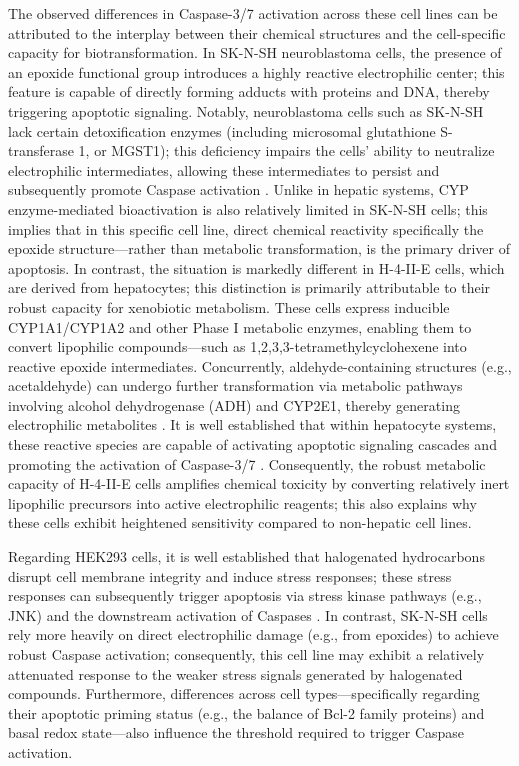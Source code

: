 \documentclass[letterpaper]{article}
\begin{document}
The observed differences in Caspase-3/7 activation across these cell lines can be attributed to the interplay between their chemical structures and the cell-specific capacity for biotransformation. In SK-N-SH neuroblastoma cells, the presence of an epoxide functional group introduces a highly reactive electrophilic center; this feature is capable of directly forming adducts with proteins and DNA, thereby triggering apoptotic signaling. Notably, neuroblastoma cells such as SK-N-SH lack certain detoxification enzymes (including microsomal glutathione S-transferase 1, or MGST1); this deficiency impairs the cells' ability to neutralize electrophilic intermediates, allowing these intermediates to persist and subsequently promote Caspase activation \cite{kelner2014absence}. Unlike in hepatic systems, CYP enzyme-mediated bioactivation is also relatively limited in SK-N-SH cells; this implies that in this specific cell line, direct chemical reactivity specifically the epoxide structure—rather than metabolic transformation, is the primary driver of apoptosis.
In contrast, the situation is markedly different in H-4-II-E cells, which are derived from hepatocytes; this distinction is primarily attributable to their robust capacity for xenobiotic metabolism. These cells express inducible CYP1A1/CYP1A2 and other Phase I metabolic enzymes, enabling them to convert lipophilic compounds—such as 1,2,3,3-tetramethylcyclohexene into reactive epoxide intermediates. Concurrently, aldehyde-containing structures (e.g., acetaldehyde) can undergo further transformation via metabolic pathways involving alcohol dehydrogenase (ADH) and CYP2E1, thereby generating electrophilic metabolites \cite{kaisarevic2015differential,markovic2022effect}. It is well established that within hepatocyte systems, these reactive species are capable of activating apoptotic signaling cascades and promoting the activation of Caspase-3/7 \cite{michels2006resveratrol}. Consequently, the robust metabolic capacity of H-4-II-E cells amplifies chemical toxicity by converting relatively inert lipophilic precursors into active electrophilic reagents; this also explains why these cells exhibit heightened sensitivity compared to non-hepatic cell lines.

Regarding HEK293 cells, it is well established that halogenated hydrocarbons disrupt cell membrane integrity and induce stress responses; these stress responses can subsequently trigger apoptosis via stress kinase pathways (e.g., JNK) and the downstream activation of Caspases \cite{michels2006resveratrol}. In contrast, SK-N-SH cells rely more heavily on direct electrophilic damage (e.g., from epoxides) to achieve robust Caspase activation; consequently, this cell line may exhibit a relatively attenuated response to the weaker stress signals generated by halogenated compounds. Furthermore, differences across cell types—specifically regarding their apoptotic priming status (e.g., the balance of Bcl-2 family proteins) and basal redox state—also influence the threshold required to trigger Caspase activation. 
\end{document}
